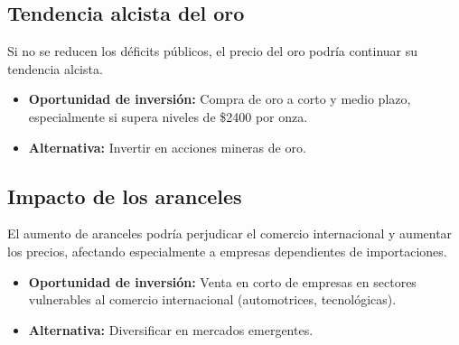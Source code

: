 \documentclass{article}
\begin{document}
\subsection{Tendencia alcista del oro}
Si no se reducen los déficits públicos, el precio del oro podría continuar su tendencia alcista. 

\begin{itemize}
    \item \textbf{Oportunidad de inversión:} Compra de oro a corto y medio plazo, especialmente si supera niveles de \$2400 por onza.
    \item \textbf{Alternativa:} Invertir en acciones mineras de oro.
\end{itemize}

\subsection{Impacto de los aranceles}
El aumento de aranceles podría perjudicar el comercio internacional y aumentar los precios, afectando especialmente a empresas dependientes de importaciones.

\begin{itemize}
    \item \textbf{Oportunidad de inversión:} Venta en corto de empresas en sectores vulnerables al comercio internacional (automotrices, tecnológicas).
    \item \textbf{Alternativa:} Diversificar en mercados emergentes.
\end{itemize}
\end{document}
